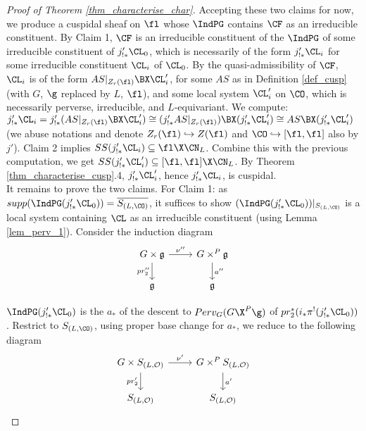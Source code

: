 \begin{proof}[Proof of Theorem \ref{thm_characterise_char}]
Accepting these two claims for now, we produce a cuspidal sheaf on $\fl$ whose $\IndPG$ contains $\CF$ as an irreducible constituent. By Claim 1, $\CF$ is an irreducible constituent of the $\IndPG$ of some irreducible constituent of $j'_{!*}\CL_0$, which is necessarily of the form $j'_{!*}\CL_i$ for some irreducible constituent $\CL_i$ of $\CL_0$. By the quasi-admissibility of $\CF$, $\CL_i$ is of the form $AS|_{Z_r(\fl)}\BX\CL_i'$, for some $AS$ as in Definition \ref{def_cusp} (with $G$, $\g$ replaced by $L$, $\fl$), and some local system $\CL'_i$ on $\CO$, which is necessarily perverse, irreducible, and $L$-equivariant. We compute: $j'_{!*}\CL_i=j'_{!*}(AS|_{Z_r(\fl)}\BX\CL_i')\cong (j'_{!*}AS|_{Z_r(\fl)})\BX(j'_{!*}\CL_i')\cong AS\BX(j'_{!*}\CL_i')$ (we abuse notations and denote $Z_r(\fl)\hookrightarrow Z(\fl)$ and $\CO\hookrightarrow [\fl,\fl]$ also by $j'$). Claim 2 implies $SS(j'_{!*}\CL_i)\subseteq \fl\X\CN_L$. Combine this with the previous computation, we get $SS(j'_{!*}\CL'_i)\subseteq [\fl,\fl]\X\CN_L$. By Theorem \ref{thm_characterise_cusp}.4, $j'_{!*}\CL'_i$, hence $j'_{!*}\CL_i$, is cuspidal.\\

It remains to prove the two claims. For Claim 1: as $supp(\IndPG(j'_{!*}\CL_0))=\overline{S_{(L,\CO)}}$, it suffices to show $(\IndPG(j'_{!*}\CL_0))|_{S_{(L,\CO)}}$ is a local system containing $\CL$ as an irreducible constituent (using Lemma \ref{lem_perv_1}). Consider the induction diagram
\[\begin{tikzcd}
	{G\times\mathfrak{g}} & {G\times^P\mathfrak{g}} \\
	{\mathfrak{g}} & {\mathfrak{g}}
	\arrow["{pr''_2}"', from=1-1, to=2-1]
	\arrow["\nu''", from=1-1, to=1-2]
	\arrow["a''", from=1-2, to=2-2]
\end{tikzcd}\]

$\IndPG(j'_{!*}\CL_0)$ is the $a_*$ of the descent to $Perv_G(G\X^P\g)$ of $pr_2^*(i_*\pi^!(j'_{!*}\CL_0))$. Restrict to $S_{(L,\CO)}$, using proper base change for $a_*$, we reduce to the following diagram 
\[\begin{tikzcd}
	{G\times S_{(L,\mathcal{O})}} & {G\times^PS_{(L,\mathcal{O})}} \\
	{S_{(L,\mathcal{O})}} & {S_{(L,\mathcal{O})}}
	\arrow["{pr'_2}"', from=1-1, to=2-1]
	\arrow["\nu'", from=1-1, to=1-2]
	\arrow["a'", from=1-2, to=2-2]
\end{tikzcd}\]


\end{proof}
